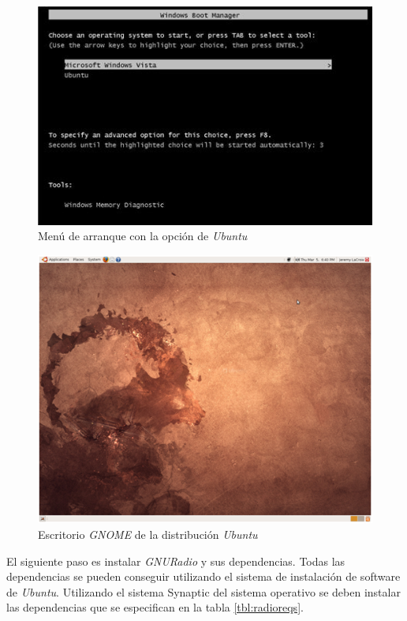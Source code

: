 \begin{figure}[htp]
\centering
	\includegraphics[scale=0.8]{figs/boot}
	\vspace{0.1in}
	\caption{Men\'u de arranque con la opci\'on de \emph{Ubuntu}}
	\label{fig:bootmenu}
\end{figure}

\begin{figure}[htp]
\centering
	\includegraphics[scale=0.7]{figs/desk}
	\vspace{0.1in}
	\caption{Escritorio \emph{GNOME} de la distribuci\'on \emph{Ubuntu}}
	\label{fig:desktop}
\end{figure}

El siguiente paso es instalar \emph{GNURadio} y sus dependencias. Todas las dependencias se pueden conseguir utilizando el sistema
de instalaci\'on de software de \emph{Ubuntu}. Utilizando el sistema Synaptic del sistema operativo se deben instalar las
dependencias que se especifican en la tabla \ref{tbl:radioreqs}.

